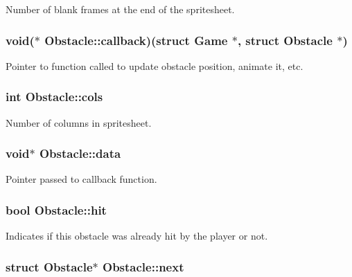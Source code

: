 \-Number of blank frames at the end of the spritesheet. \hypertarget{structObstacle_a21b4ff0edaa2dc5394ff7a6328e48358}{
\subsubsection[{callback}]{\setlength{\rightskip}{0pt plus 5cm}void($\ast$ {\bf \-Obstacle\-::callback})(struct {\bf \-Game} $\ast$, struct {\bf \-Obstacle} $\ast$)}}\label{structObstacle_a21b4ff0edaa2dc5394ff7a6328e48358}
\-Pointer to function called to update obstacle position, animate it, etc. \hypertarget{structObstacle_ad51aa07361c732a47e78c80fae2fab7c}{
\subsubsection[{cols}]{\setlength{\rightskip}{0pt plus 5cm}int {\bf \-Obstacle\-::cols}}}\label{structObstacle_ad51aa07361c732a47e78c80fae2fab7c}
\-Number of columns in spritesheet. \hypertarget{structObstacle_a88728e624cc62993e2bf52aff816cdff}{
\subsubsection[{data}]{\setlength{\rightskip}{0pt plus 5cm}void$\ast$ {\bf \-Obstacle\-::data}}}\label{structObstacle_a88728e624cc62993e2bf52aff816cdff}
\-Pointer passed to callback function. \hypertarget{structObstacle_ac89d025f4ad7c2f083d262c1bee4e851}{
\subsubsection[{hit}]{\setlength{\rightskip}{0pt plus 5cm}bool {\bf \-Obstacle\-::hit}}}\label{structObstacle_ac89d025f4ad7c2f083d262c1bee4e851}
\-Indicates if this obstacle was already hit by the player or not. \hypertarget{structObstacle_aedbcf65351fa59ca9f18f6fba0287dc1}{
\subsubsection[{next}]{\setlength{\rightskip}{0pt plus 5cm}struct {\bf \-Obstacle}$\ast$ {\bf \-Obstacle\-::next}}}\label{structObstacle_aedbcf65351fa59ca9f18f6fba0287dc1}
